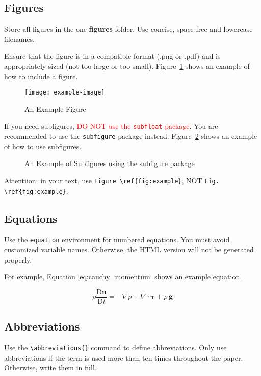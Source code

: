 \documentclass[
  manuscript=article,  %
  layout=preprint,  %
  year=20xx,
  volume=x,
]{extra/joas}
\begin{document}
\subsection{Figures}
Store all figures in the one \textbf{figures} folder. Use concise, space-free and lowercase filenames.

Ensure that the figure is in a compatible format (.png or .pdf) and is appropriately sized (not too large or too small). Figure~\ref{fig:example} shows an example of how to include a figure. 

\begin{figure}[htbp!]
  \centering
  \texttt{[image: example-image]}
  \caption{An Example Figure}
  \label{fig:example}
\end{figure}

If you need subfigures, \textcolor{red}{DO NOT use the \texttt{subfloat} package}. You are recommended to use the \texttt{subfigure} package instead. Figure~\ref{fig:subfig_example} shows an example of how to use subfigures.

\begin{figure}[htbp!]
  \centering
  \hspace{0.2cm}
  \caption{An Example of Subfigures using the subfigure package}
  \label{fig:subfig_example}
\end{figure}

Attentiion: in your text, use \verb|Figure \ref{fig:example}|, NOT \verb|Fig. \ref{fig:example}|.


\subsection{Equations}
Use the \verb|equation| environment for numbered equations. You must avoid customized variable names. Otherwise, the HTML version will not be generated properly.

For example, Equation \ref{eq:cauchy_momentum} shows an example equation.

\begin{equation} \label{eq:cauchy_momentum}
\rho\frac{\mathrm{D} \mathbf{u}}{\mathrm{D} t} = - \nabla p + \nabla \cdot \boldsymbol \tau + \rho\,\mathbf{g}
\end{equation}

\subsection{Abbreviations}
Use the \verb|\abbreviations{}| command to define abbreviations. Only use abbreviations if the term is used more than ten times throughout the paper. Otherwise, write them in full.
\end{document}
